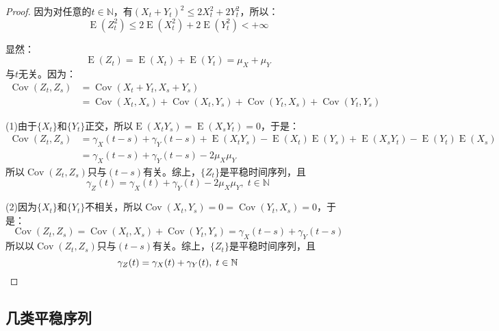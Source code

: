 \begin{proof}
	因为对任意的$t\in\mathbb{N}$，有$(X_t+Y_t)^2\leqslant2X_t^2+2Y_t^2$，所以：
	\begin{equation*}
		\operatorname{E}(Z_t^2)\leqslant2\operatorname{E}(X_t^2)+2\operatorname{E}(Y_t^2)<+\infty
	\end{equation*}\par
	显然：
	\begin{equation*}
		\operatorname{E}(Z_t)=\operatorname{E}(X_t)+\operatorname{E}(Y_t)=\mu_X+\mu_Y
	\end{equation*}
	与$t$无关。因为：
	\begin{align*}
		\operatorname{Cov}(Z_t,Z_s)
		&=\operatorname{Cov}(X_t+Y_t,X_s+Y_s) \\
		&=\operatorname{Cov}(X_t,X_s)+\operatorname{Cov}(X_t,Y_s)+\operatorname{Cov}(Y_t,X_s)+\operatorname{Cov}(Y_t,Y_s)
	\end{align*}\par
	(1)由于$\{X_t\}$和$\{Y_t\}$正交，所以$\operatorname{E}(X_tY_s)=\operatorname{E}(X_sY_t)=0$，于是：
	\begin{align*}
		\operatorname{Cov}(Z_t,Z_s)
		&=\gamma_X(t-s)+\gamma_Y(t-s)+\operatorname{E}(X_tY_s)-\operatorname{E}(X_t)\operatorname{E}(Y_s)+\operatorname{E}(X_sY_t)-\operatorname{E}(Y_t)\operatorname{E}(X_s) \\
		&=\gamma_X(t-s)+\gamma_Y(t-s)-2\mu_X\mu_Y
	\end{align*}
	所以$\operatorname{Cov}(Z_t,Z_s)$只与$(t-s)$有关。综上，$\{Z_t\}$是平稳时间序列，且
	\begin{equation*}
		\gamma_Z(t)=\gamma_X(t)+\gamma_Y(t)-2\mu_X\mu_Y,\;t\in\mathbb{N}
	\end{equation*}\par
	(2)因为$\{X_t\}$和$\{Y_t\}$不相关，所以$\operatorname{Cov}(X_t,Y_s)=0=\operatorname{Cov}(Y_t,X_s)=0$，于是：
	\begin{equation*}
		\operatorname{Cov}(Z_t,Z_s)=\operatorname{Cov}(X_t,X_s)+\operatorname{Cov}(Y_t,Y_s)=\gamma_X(t-s)+\gamma_Y(t-s)
	\end{equation*}
	所以以$\operatorname{Cov}(Z_t,Z_s)$只与$(t-s)$有关。综上，$\{Z_t\}$是平稳时间序列，且
	\begin{equation*}
		\gamma_Z(t)=\gamma_X(t)+\gamma_Y(t),\;t\in\mathbb{N}\qedhere
	\end{equation*}
\end{proof}


\subsection{几类平稳序列}
